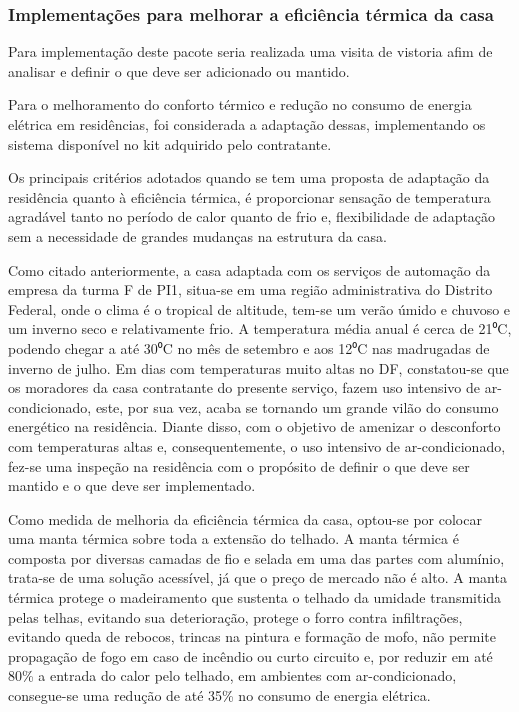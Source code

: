 \subsubsection{Implementações para melhorar a eficiência térmica da casa}
\par Para implementação deste pacote seria realizada uma visita de vistoria afim de analisar e definir o que deve ser adicionado ou mantido.
\par Para o melhoramento do conforto térmico e redução no consumo de energia elétrica em residências, foi considerada a adaptação dessas, implementando os sistema disponível no kit adquirido pelo contratante.
\par Os principais critérios adotados quando se tem uma proposta de adaptação da residência quanto à eficiência térmica, é proporcionar sensação de temperatura agradável tanto no período de calor quanto de frio e, flexibilidade de adaptação sem a necessidade de grandes mudanças na estrutura da casa.
\par Como citado anteriormente, a casa adaptada com os serviços de automação da empresa da turma F de PI1, situa-se em uma região administrativa do Distrito Federal, onde o clima é o tropical de altitude, tem-se um verão úmido e chuvoso e um inverno seco e relativamente frio. A temperatura média anual é cerca de 21⁰C, podendo chegar a até 30⁰C no mês de setembro e aos 12⁰C nas madrugadas de inverno de julho. Em dias com temperaturas muito altas no DF, constatou-se que os moradores da casa contratante do presente serviço, fazem uso intensivo de ar-condicionado, este, por sua vez, acaba se tornando um grande vilão do consumo energético na residência. Diante disso, com o objetivo de amenizar o desconforto com temperaturas altas e, consequentemente, o uso intensivo de ar-condicionado, fez-se uma inspeção na residência com o propósito de definir o que deve ser mantido e o que deve ser implementado.
\par Como medida de melhoria da eficiência térmica da casa, optou-se por colocar uma manta térmica sobre toda a extensão do telhado. A manta térmica é composta por diversas camadas de fio e selada em uma das partes com alumínio, trata-se de uma solução acessível, já que o preço de mercado não é alto. A manta térmica protege o madeiramento que sustenta o telhado da umidade transmitida pelas telhas, evitando sua deterioração, protege o forro contra infiltrações, evitando queda de rebocos, trincas na pintura e formação de mofo, não permite propagação de fogo em caso de incêndio ou curto circuito e, por reduzir em até 80\% a entrada do calor pelo telhado, em ambientes com ar-condicionado, consegue-se uma redução de até 35\% no consumo de energia elétrica.
